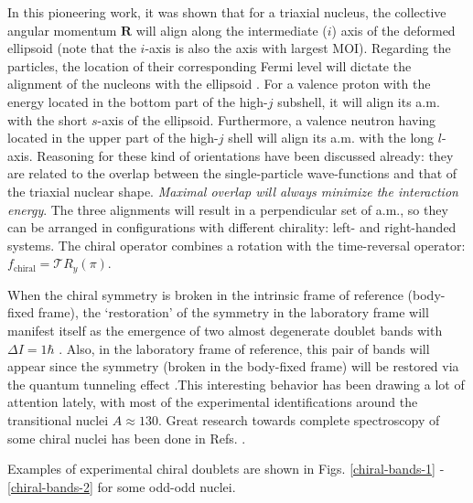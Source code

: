 In this pioneering work, it was shown that for a triaxial nucleus, the collective angular momentum $\mathbf{R}$ will align along the intermediate ($i$) axis of the deformed ellipsoid (note that the $i$-axis is also the axis with largest MOI). Regarding the particles, the location of their corresponding Fermi level will dictate the alignment of the nucleons with the ellipsoid \cite{frauendorf1997tilted,starosta2001chiral}. For a valence proton with the energy located in the bottom part of the high-$j$ subshell, it will align its a.m. with the short $s$-axis of the ellipsoid. Furthermore, a valence neutron having located in the upper part of the high-$j$ shell will align its a.m. with the long $l$-axis. Reasoning for these kind of orientations have been discussed already: they are related to the overlap between the single-particle wave-functions and that of the triaxial nuclear shape. \emph{Maximal overlap will always minimize the interaction energy}. The three alignments will result in a perpendicular set of a.m., so they can be arranged in configurations with different chirality: left- and right-handed systems. The chiral operator combines a rotation with the time-reversal operator: $f_\text{chiral}=\mathcal{T}R_y(\pi)$.

When the chiral symmetry is broken in the intrinsic frame of reference (body-fixed frame), the `restoration' of the symmetry in the laboratory frame will manifest itself as the emergence of two almost degenerate doublet bands with $\Delta I=1\hbar$ \cite{frauendorf1997tilted}. Also, in the laboratory frame of reference, this pair of bands will appear since the symmetry (broken in the body-fixed frame) will be restored via the quantum tunneling effect \cite{zhang2007chiral} .This interesting behavior has been drawing a lot of attention lately, with most of the experimental identifications around the transitional nuclei $A\approx 130$. Great research towards complete spectroscopy of some chiral nuclei has been done in Refs. \cite{starosta2001chiral,meng2008chiral,budaca2018tilted,budaca2018semiclassical,budaca2021chiral}.

Examples of experimental chiral doublets are shown in Figs. \ref{chiral-bands-1} - \ref{chiral-bands-2} for some odd-odd nuclei.

